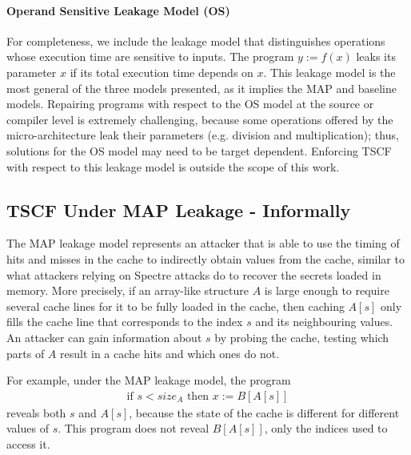 \paragraph*{Operand Sensitive Leakage Model (OS)} For completeness, we include the leakage model that distinguishes operations whose execution time are sensitive to inputs. The program $y:=f(x)$ leaks its parameter $x$ if its total execution time depends on $x$. This leakage model is the most general of the three models presented, as it implies the MAP and baseline models. Repairing programs with respect to the OS model at the source or compiler level is extremely challenging, because some operations offered by the micro-architecture leak their parameters (e.g. division and multiplication); thus, solutions for the OS model may need to be target dependent. Enforcing TSCF with respect to this leakage model is outside the scope of this work.

\subsection{TSCF Under MAP Leakage - Informally}
\label{sec:MAP}
The MAP leakage model represents an attacker that is able to use the timing of hits and misses in the cache to indirectly obtain values from the cache, similar to what attackers relying on Spectre attacks do to recover the secrets loaded in memory. More precisely, if an array-like structure $A$ is large enough to require several cache lines for it to be fully loaded in the cache, then caching $A[s]$ only fills the cache line that corresponds to the index $s$ and its neighbouring values. An attacker can gain information about $s$ by probing the cache, testing which parts of $A$ result in a cache hits and which ones do not. 

For example, under the MAP leakage model, the program 
\begin{align*}
    \text{if $s<size_A$ then $x:=B[A[s]]$}
\end{align*} 
reveals both $s$ and $A[s]$, because the state of the cache is different for different values of $s$. This program does not reveal $B[A[s]]$, only the indices used to access it.


